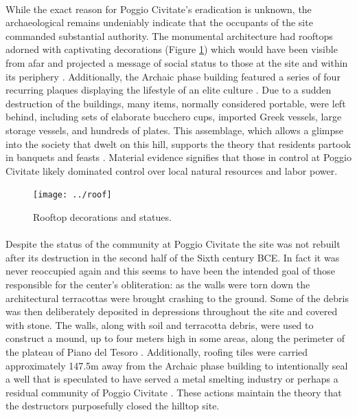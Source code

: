 \documentclass[12pt,a4paper]{thesis}
\begin{document}

\paragraph{}
While the exact reason for Poggio Civitate's eradication is unknown, the archaeological remains undeniably indicate that the occupants of the site commanded substantial authority.  The monumental architecture had rooftops adorned with captivating decorations (Figure \ref{fig:roof}) which would have been visible from afar and projected a message of social status to those at the site and within its periphery \citep{Tuc06,Odo13}. Additionally, the Archaic phase building featured a series of four recurring plaques displaying the lifestyle of an elite culture \cite[159]{Win09}. Due to a sudden destruction of the buildings, many items, normally considered portable, were left behind, including sets of elaborate bucchero cups, imported Greek vessels, large storage vessels, and hundreds of plates. This assemblage, which allows a glimpse into the society that dwelt on this hill, supports the theory that residents partook in banquets and feasts \cite[162-166]{BarRas98}. Material evidence signifies that those in control at Poggio Civitate likely dominated control over local natural resources and labor power. 

\begin{figure}
\centering
\texttt{[image: ../roof]}
\caption[Rooftop decorations and statues]{Rooftop decorations and statues\footnotemark.}
\label{fig:roof}
\end{figure}


\paragraph{}
Despite the status of the community at Poggio Civitate the site was not rebuilt after its destruction in the second half of the Sixth century BCE. In fact it was never reoccupied again and this seems to have been the intended goal of those responsible for the center's obliteration: as the walls were torn down the architectural terracottas were brought crashing to the ground. Some of the debris was then deliberately deposited in depressions throughout the site and covered with stone. The walls, along with soil and terracotta debris, were used to construct a mound, up to four meters high in some areas, along the perimeter of the plateau of Piano del Tesoro \citep{IEB94}. Additionally, roofing tiles were carried approximately 147.5m away from the Archaic phase building to intentionally seal a well that is speculated to have served a metal smelting industry or perhaps a residual community of Poggio Civitate \citep{TucBruHunTal10}. These actions maintain the theory that the destructors purposefully closed the hilltop site.
\end{document}
